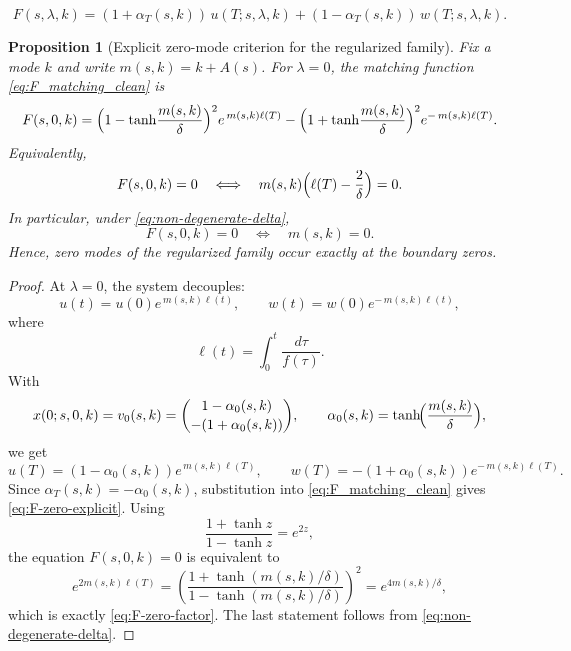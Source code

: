 \documentclass[10pt,a4paper]{amsart}
\newtheorem{proposition}{Proposition}
\begin{document}
\begin{equation}\label{eq:F_matching_clean}
F(s,\lambda,k)=
(1+\alpha_T(s,k))\,u(T;s,\lambda,k)
+
(1-\alpha_T(s,k))\,w(T;s,\lambda,k).
\end{equation}

\begin{proposition}[Explicit zero-mode criterion for the regularized family]
\label{prop:explicit-zero-mode-criterion}
Fix a mode \(k\) and write \(m(s,k)=k+A(s)\). For \(\lambda=0\), the matching function \eqref{eq:F_matching_clean} is
\begin{equation}\label{eq:F-zero-explicit}
F(s,0,k)
=
\Bigl(1-\tanh\!\frac{m(s,k)}{\delta}\Bigr)^2 e^{\,m(s,k)\ell(T)}
-
\Bigl(1+\tanh\!\frac{m(s,k)}{\delta}\Bigr)^2 e^{-\,m(s,k)\ell(T)}.
\end{equation}
Equivalently,
\begin{equation}\label{eq:F-zero-factor}
F(s,0,k)=0
\quad\Longleftrightarrow\quad
m(s,k)\Bigl(\ell(T)-\frac{2}{\delta}\Bigr)=0.
\end{equation}
In particular, under \eqref{eq:non-degenerate-delta},
\begin{equation}
F(s,0,k)=0
\quad\Longleftrightarrow\quad
m(s,k)=0.
\end{equation}
Hence, zero modes of the regularized family occur exactly at the boundary zeros.
\end{proposition}

\begin{proof}
At \(\lambda=0\), the system decouples:
\begin{equation}
u(t)=u(0)e^{\,m(s,k)\ell(t)},
\qquad
w(t)=w(0)e^{-\,m(s,k)\ell(t)},
\end{equation}
where
\begin{equation}
\ell(t)=\int_0^t \frac{d\tau}{f(\tau)}.
\end{equation}
With
\begin{equation}
x(0;s,0,k)=v_0(s,k)
=
\binom{1-\alpha_0(s,k)}{-(1+\alpha_0(s,k))},
\qquad
\alpha_0(s,k)=\tanh\!\Bigl(\frac{m(s,k)}{\delta}\Bigr),
\end{equation}
we get
\begin{equation}
u(T)=(1-\alpha_0(s,k))e^{\,m(s,k)\ell(T)},
\qquad
w(T)=-(1+\alpha_0(s,k))e^{-\,m(s,k)\ell(T)}.
\end{equation}
Since \(\alpha_T(s,k)=-\alpha_0(s,k)\), substitution into \eqref{eq:F_matching_clean} gives \eqref{eq:F-zero-explicit}. Using
\begin{equation}
\frac{1+\tanh z}{1-\tanh z}=e^{2z},
\end{equation}
the equation \(F(s,0,k)=0\) is equivalent to
\begin{equation}
e^{2m(s,k)\ell(T)}
=
\left(\frac{1+\tanh(m(s,k)/\delta)}{1-\tanh(m(s,k)/\delta)}\right)^2
=
e^{4m(s,k)/\delta},
\end{equation}
which is exactly \eqref{eq:F-zero-factor}. The last statement follows from \eqref{eq:non-degenerate-delta}.
\end{proof}
\end{document}
